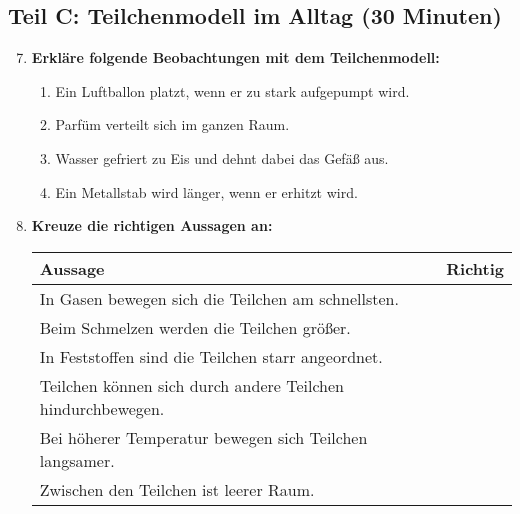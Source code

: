 \subsection*{Teil C: Teilchenmodell im Alltag (30 Minuten)}

\begin{enumerate}[label=\arabic*.]
    \setcounter{enumi}{6}

    \item \textbf{Erkläre folgende Beobachtungen mit dem Teilchenmodell:}
    \vspace{0.5cm}

    \begin{enumerate}[label=\alph*)]
        \item Ein Luftballon platzt, wenn er zu stark aufgepumpt wird.
        \vspace{2cm}

        \item Parfüm verteilt sich im ganzen Raum.
        \vspace{2cm}

        \item Wasser gefriert zu Eis und dehnt dabei das Gefäß aus.
        \vspace{2cm}

        \item Ein Metallstab wird länger, wenn er erhitzt wird.
        \vspace{2cm}
    \end{enumerate}

    \vspace{1cm}

    \item \textbf{Kreuze die richtigen Aussagen an:}
    \vspace{0.5cm}

    \begin{tabularx}{\textwidth}{|X|c|}
        \hline
        \textbf{Aussage} & \textbf{Richtig} \\
        \hline
        In Gasen bewegen sich die Teilchen am schnellsten. & \\
        \hline
        Beim Schmelzen werden die Teilchen größer. & \\
        \hline
        In Feststoffen sind die Teilchen starr angeordnet. & \\
        \hline
        Teilchen können sich durch andere Teilchen hindurchbewegen. & \\
        \hline
        Bei höherer Temperatur bewegen sich Teilchen langsamer. & \\
        \hline
        Zwischen den Teilchen ist leerer Raum. & \\
        \hline
    \end{tabularx}

\end{enumerate}